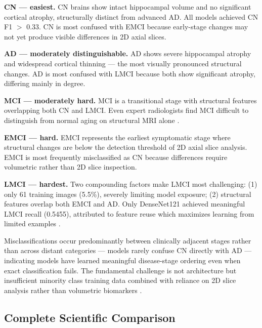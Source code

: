 \documentclass[12pt, a4paper]{article}
\begin{document}
\textbf{CN --- easiest.} CN brains show intact
hippocampal volume and no significant cortical
atrophy, structurally distinct from advanced AD.
All models achieved CN F1 $>$ 0.33. CN is most
confused with EMCI because early-stage changes
may not yet produce visible differences in 2D
axial slices.

\textbf{AD --- moderately distinguishable.} AD
shows severe hippocampal atrophy and widespread
cortical thinning \cite{lim2022} --- the most
visually pronounced structural changes. AD is
most confused with LMCI because both show
significant atrophy, differing mainly in degree.

\textbf{MCI --- moderately hard.} MCI is a
transitional stage with structural features
overlapping both CN and LMCI. Even expert
radiologists find MCI difficult to distinguish
from normal aging on structural MRI alone
\cite{lim2022}.

\textbf{EMCI --- hard.} EMCI represents the
earliest symptomatic stage where structural
changes are below the detection threshold of
2D axial slice analysis. EMCI is most frequently
misclassified as CN because differences require
volumetric rather than 2D slice inspection.

\textbf{LMCI --- hardest.} Two compounding
factors make LMCI most challenging: (1) only
61 training images (5.5\%), severely limiting
model exposure; (2) structural features overlap
both EMCI and AD. Only DenseNet121 achieved
meaningful LMCI recall (0.5455), attributed to
feature reuse which maximizes learning from
limited examples \cite{huang2017}.

Misclassifications occur predominantly between
clinically adjacent stages rather than across
distant categories --- models rarely confuse CN
directly with AD --- indicating models have
learned meaningful disease-stage ordering even
when exact classification fails. The fundamental
challenge is not architecture but insufficient
minority class training data combined with
reliance on 2D slice analysis rather than
volumetric biomarkers \cite{lim2022}.

\subsection{Complete Scientific Comparison}
\end{document}
